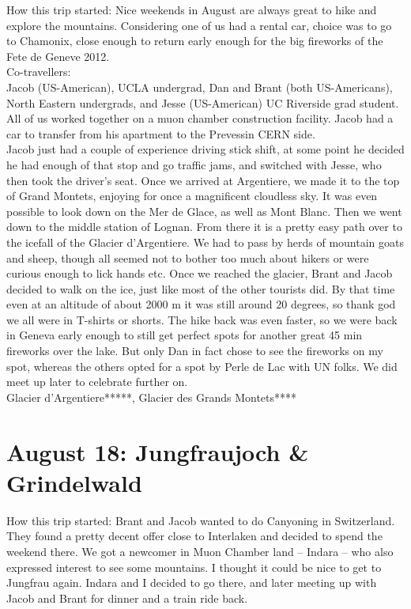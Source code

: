 How this trip started: Nice weekends in August are always great to hike and explore the mountains. Considering one of us had a rental car, choice was to go to Chamonix, close enough to return early enough for the big fireworks of the Fete de Geneve 2012.\\

Co-travellers:\\
Jacob (US-American), UCLA undergrad, Dan and Brant (both US-Americans), North Eastern undergrads, and Jesse (US-American) UC Riverside grad student. All of us worked together on a muon chamber construction facility. Jacob had a car to transfer from his apartment to the Prevessin CERN side.\\

Jacob just had a couple of experience driving stick shift, at some point he decided he had enough of that stop and go traffic jams, and switched with Jesse, who then took the driver's seat. Once we arrived at Argentiere, we made it to the top of Grand Montets, enjoying for once a magnificent cloudless sky. It was even possible to look down on the Mer de Glace, as well as Mont Blanc. Then we went down to the middle station of Lognan. From there it is a pretty easy path over to the icefall of the Glacier d'Argentiere. We had to pass by herds of mountain goats and sheep, though all seemed not to bother too much about hikers or were curious enough to lick hands etc. Once we reached the glacier, Brant and Jacob decided to walk on the ice, just like most of the other tourists did. By that time even at an altitude of about 2000 m it was still around 20 degrees, so thank god we all were in T-shirts or shorts. The hike back was even faster, so we were back in Geneva early enough to still get perfect spots for another great 45 min fireworks over the lake. But only Dan in fact chose to see the fireworks on my spot, whereas the others opted for a spot by Perle de Lac with UN folks. We did meet up later to celebrate further on.\\

Glacier d'Argentiere*****, Glacier des Grands Montets****

\section{August 18: Jungfraujoch \& Grindelwald}
\label{Jsungfrau2012}

How this trip started: Brant and Jacob wanted to do Canyoning in Switzerland. They found a pretty decent offer close to Interlaken and decided to spend the weekend there. We got a newcomer in Muon Chamber land -- Indara -- who also expressed interest to see some mountains. I thought it could be nice to get to Jungfrau again. Indara and I decided to go there, and later meeting up with Jacob and Brant for dinner and a train ride back.\\

